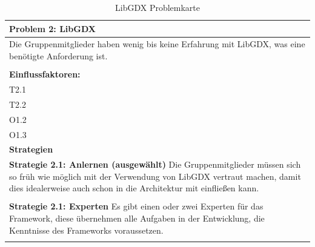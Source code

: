 \documentclass[fontsize=12pt,paper=a4,twoside]{scrartcl}
\begin{document}
\begin{table}[H]
    \centering
    \begin{tabular}{|p{15cm}|}
    \hline
          \textbf{Problem 2:} LibGDX \\ \hline
	Die Gruppenmitglieder haben wenig bis keine Erfahrung mit LibGDX, was eine benötigte Anforderung ist. \\
         \\ \hline
          \textbf{Einflussfaktoren: } \\
	T2.1 \\
	T2.2 \\
	O1.2 \\
	O1.3 \\
          \hline
          \textbf{Strategien} \\ \hline
            {}          
           \label{strategie:2.1}     
          \textbf{Strategie 2.1: Anlernen (ausgewählt)} Die Gruppenmitglieder müssen sich so früh wie möglich mit der Verwendung von LibGDX vertraut machen, damit dies idealerweise auch schon in die Architektur mit einfließen kann.  \\        
	 \\ \hline
	 {}          
           \label{strategie:2.2}     
          \textbf{Strategie 2.1: Experten} Es gibt einen oder zwei Experten für das Framework, diese übernehmen alle Aufgaben in der Entwicklung, die Kenntnisse des Frameworks voraussetzen.\\        
	 \\ \hline
    \end{tabular}

    \caption{LibGDX Problemkarte}
    \label{tab:ProblemKarte2}
\end{table}
\end{document}
